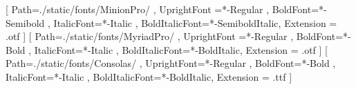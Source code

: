 %
%

\setmainfont{MinionPro}[
   Path=./static/fonts/MinionPro/ ,
   UprightFont =*-Regular ,
   BoldFont=*-Semibold ,
   ItalicFont=*-Italic ,
   BoldItalicFont=*-SemiboldItalic,
   Extension = .otf
 ]
\setsansfont{MyriadPro}[
   Path=./static/fonts/MyriadPro/ ,
   UprightFont =*-Regular ,
   BoldFont=*-Bold ,
   ItalicFont=*-Italic ,
   BoldItalicFont=*-BoldItalic,
   Extension = .otf
 ]
\setmonofont{Consolas}[
   Path=./static/fonts/Consolas/ ,
   UprightFont=*-Regular ,
   BoldFont=*-Bold ,
   ItalicFont=*-Italic ,
   BoldItalicFont=*-BoldItalic,
   Extension = .ttf
 ]

\makeatletter
\def\cleardoublepage{\clearpage\if@twoside \ifodd\c@page\else
   \hbox{}
   \thispagestyle{plain}
   \newpage
   \if@twocolumn\hbox{}\newpage\fi\fi\fi}
\makeatother \clearpage{\pagestyle{plain}\cleardoublepage}

\newcommand\introname{Introduction}
\newcommand\intro{%
    \chapter*{\introname
        \markboth{%
           \MakeUppercase\introname}{\MakeUppercase\introname}}%
}

\newcommand\grintroname{Εισαγωγή}
\newcommand\grintro{%
    \chapter*{\grintroname
        \markboth{%
           \MakeUppercase\grintroname}{\MakeUppercase\grintroname}}%
}

\newcommand\abstractname{Abstract}
\newcommand\abstract{%
    \cleardoublepage
    \section*{\abstractname
        \markboth{}{}}%
}

\newcommand\grabstractname{Περίληψη}
\newcommand\grabstract{%
    \cleardoublepage
    \section*{\grabstractname%
        \markboth{}{}}%
}

